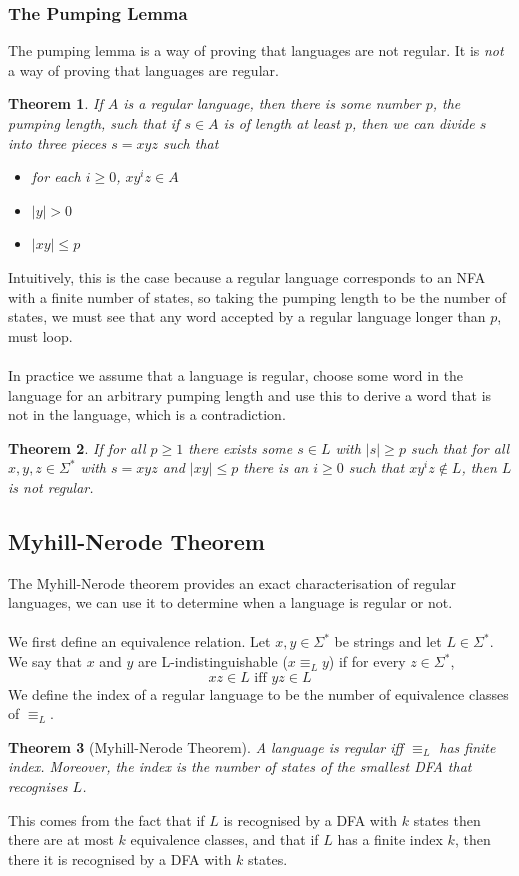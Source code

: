 \documentclass{article}
\newtheorem{thm}{Theorem}
\begin{document}
        \subsubsection{The Pumping Lemma}
        The pumping lemma is a way of proving that languages are not regular. It is \textit{not} a way of proving that languages are regular. 
        \begin{thm}
            If $A$ is a regular language, then there is some number $p$, the pumping length,  such that if $s \in A$ is of length at least $p$, then we can divide $s$ into three pieces $s = xyz$ such that
            \begin{itemize}
                \item for each $i \geq 0$, $xy^iz \in A$
                \item $|y| > 0$
                \item $|xy| \leq p$
            \end{itemize}
        \end{thm}
        Intuitively, this is the case because a regular language corresponds to an NFA with a finite number of states, so taking the pumping length to be the number of states, we must see that any word accepted by a regular language longer than $p$, must loop. \\ \\
        In practice we assume that a language is regular, choose some word in the language for an arbitrary pumping length and use this to derive a word that is not in the language, which is a contradiction. 
        \begin{thm}
            If for all $p \geq 1$ there exists some $s \in L$ with $|s| \geq p$ such that for all $x, y, z \in \Sigma^*$ with $s = xyz$ and $|xy| \leq p$ there is an $i \geq 0$ such that $xy^iz \notin L$, then $L$ is not regular. 
        \end{thm}
        \subsection{Myhill-Nerode Theorem}
        The Myhill-Nerode theorem provides an exact characterisation of regular languages, we can use it to determine when a language is regular or not. \\ \\
        We first define an equivalence relation. Let $x, y \in \Sigma^*$ be strings and let $L \in \Sigma^*$. We say that $x$ and $y$ are L-indistinguishable ($x \equiv_L y$) if for every $z \in \Sigma^*$,
        \[ xz \in L \text{ iff } yz \in L\]
        We define the index of a regular language to be the number of equivalence classes of $\equiv_L$. 
        \begin{thm}[Myhill-Nerode Theorem]
            A language is regular iff $\equiv_L$ has finite index. Moreover, the index is the number of states of the \textit{smallest} DFA that recognises $L$. 
        \end{thm}
        This comes from the fact that if $L$ is recognised by a DFA with $k$ states then there are at most $k$ equivalence classes, and that if $L$ has a finite index $k$, then there it is recognised by a DFA with $k$ states. 
\end{document}
